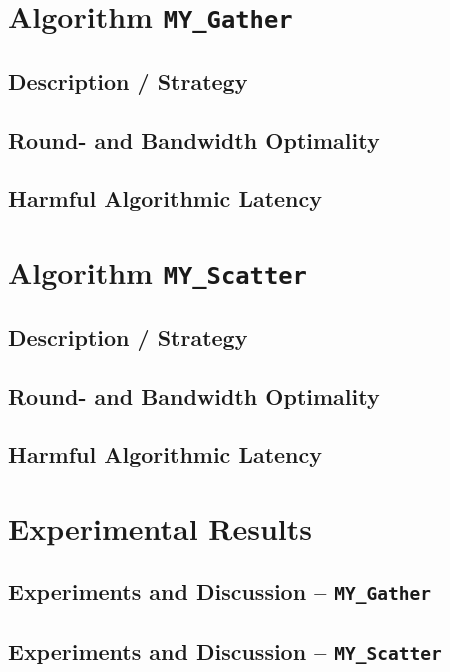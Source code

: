 
\newcommand\mygather{\texttt{MY\_Gather}\xspace}
\newcommand\myscatter{\texttt{MY\_Scatter}\xspace}

\section{Algorithm \mygather}

\subsection{Description / Strategy}

\subsection{Round- and Bandwidth Optimality}

\subsection{Harmful Algorithmic Latency}

\section{Algorithm \myscatter}

\subsection{Description / Strategy}

\subsection{Round- and Bandwidth Optimality}

\subsection{Harmful Algorithmic Latency}

\section{Experimental Results}

\subsection{Experiments and Discussion -- \mygather}

\subsection{Experiments and Discussion -- \myscatter}

